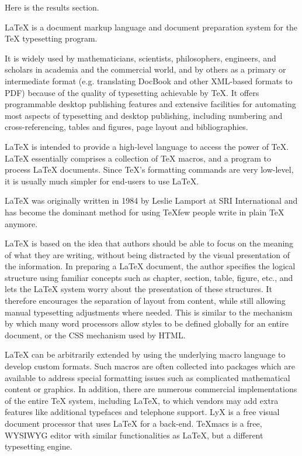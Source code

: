 
Here is the results section.

LaTeX is a document markup language and document preparation system for the TeX typesetting program.

It is widely used by mathematicians, scientists, philosophers, engineers, and scholars in academia and the commercial world, and by others as a primary or intermediate format (e.g. translating DocBook and other XML-based formats to PDF) because of the quality of typesetting achievable by TeX. It offers programmable desktop publishing features and extensive facilities for automating most aspects of typesetting and desktop publishing, including numbering and cross-referencing, tables and figures, page layout and bibliographies.

LaTeX is intended to provide a high-level language to access the power of TeX. LaTeX essentially comprises a collection of TeX macros, and a program to process LaTeX documents. Since TeX's formatting commands are very low-level, it is usually much simpler for end-users to use LaTeX.

LaTeX was originally written in 1984 by Leslie Lamport at SRI International and has become the dominant method for using TeXfew people write in plain TeX anymore.

LaTeX is based on the idea that authors should be able to focus on the meaning of what they are writing, without being distracted by the visual presentation of the information. In preparing a LaTeX document, the author specifies the logical structure using familiar concepts such as chapter, section, table, figure, etc., and lets the LaTeX system worry about the presentation of these structures. It therefore encourages the separation of layout from content, while still allowing manual typesetting adjustments where needed. This is similar to the mechanism by which many word processors allow styles to be defined globally for an entire document, or the CSS mechanism used by HTML.

LaTeX can be arbitrarily extended by using the underlying macro language to develop custom formats. Such macros are often collected into packages which are available to address special formatting issues such as complicated mathematical content or graphics. In addition, there are numerous commercial implementations of the entire TeX system, including LaTeX, to which vendors may add extra features like additional typefaces and telephone support. LyX is a free visual document processor that uses LaTeX for a back-end. TeXmacs is a free, WYSIWYG editor with similar functionalities as LaTeX, but a different typesetting engine.

